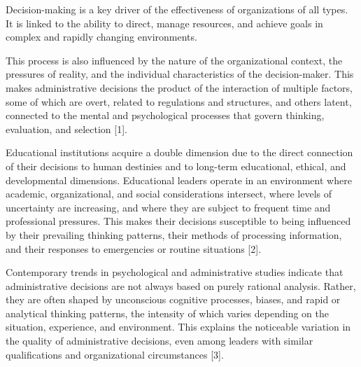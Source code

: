 \documentclass[10pt]{NSP1}
\begin{document}
\raggedbottom
\setlength{\textfloatsep}{12pt plus 2pt minus 2pt}
\setlength{\intextsep}{12pt plus 2pt minus 2pt}
\setlength{\floatsep}{12pt plus 2pt minus 2pt}


\par\vspace{6.0pt}\vspace{12.0pt}

Decision-making is a key driver of the effectiveness of organizations of all types. It is linked to the ability to direct, manage resources, and achieve goals in complex and rapidly changing environments.

This process is also influenced by the nature of the organizational context, the pressures of reality, and the individual characteristics of the decision-maker. This makes administrative decisions the product of the interaction of multiple factors, some of which are overt, related to regulations and structures, and others latent, connected to the mental and psychological processes that govern thinking, evaluation, and selection [1].

Educational institutions acquire a double dimension due to the direct connection of their decisions to human destinies and to long-term educational, ethical, and developmental dimensions. Educational leaders operate in an environment where academic, organizational, and social considerations intersect, where levels of uncertainty are increasing, and where they are subject to frequent time and professional pressures. This makes their decisions susceptible to being influenced by their prevailing thinking patterns, their methods of processing information, and their responses to emergencies or routine situations [2].

Contemporary trends in psychological and administrative studies indicate that administrative decisions are not always based on purely rational analysis. Rather, they are often shaped by unconscious cognitive processes, biases, and rapid or analytical thinking patterns, the intensity of which varies depending on the situation, experience, and environment. This explains the noticeable variation in the quality of administrative decisions, even among leaders with similar qualifications and organizational circumstances [3].
\end{document}
